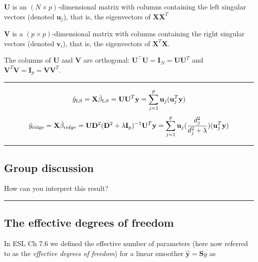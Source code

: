 \documentclass[
  letterpaper,
  DIV=11,
  numbers=noendperiod]{scrartcl}
\begin{document}
\(\mathbf{U}\) is an \((N \times p)\)-dimensional matrix with columns
containing the left singular vectors (denoted \(\mathbf{u}_j\)), that
is, the eigenvectors of \({\mathbf X}{\mathbf X}^T\)

\(\mathbf{V}\) is a \((p \times p)\)-dimensional matrix with columns
containing the right singular vectors (denoted \(\mathbf{v}_i\)), that
is, the eigenvectors of \({\mathbf X}^T{\mathbf X}\).

The columns of \(\mathbf{U}\) and \(\mathbf{V}\) are orthogonal:
\(\mathbf{U}^{\top} \mathbf{U} = \mathbf{I}_{N} = \mathbf{U}\mathbf{U}^T\)
and
\(\mathbf{V}^T \mathbf{V}= \mathbf{I}_{p} = \mathbf{V}\mathbf{V}^T\).

\begin{center}\rule{0.5\linewidth}{0.5pt}\end{center}

\[\hat{y}_{\text{LS}}={\mathbf X}\hat{\beta}_{\text LS}= {\mathbf U}{\mathbf U}^T {\mathbf y}=\sum_{j=1}^p {\mathbf u}_j ({\mathbf u}_j^T {\mathbf y})\]
\[\hat{y}_{\text{ridge}}={\mathbf X}\hat{\beta}_{\text ridge}=
{\mathbf U}{\mathbf D}^2({\mathbf D}^2+\lambda {\mathbf I}_p)^{-1}{\mathbf U}^T {\mathbf y}=
\sum_{j=1}^p {\mathbf u}_j (\frac{d_j^2}{d_j^2+\lambda})({\mathbf u}_j^T {\mathbf y})\]

\begin{center}\rule{0.5\linewidth}{0.5pt}\end{center}

\hypertarget{group-discussion-2}{%
\subsection{Group discussion}\label{group-discussion-2}}

How can you interpret this result?

\begin{center}\rule{0.5\linewidth}{0.5pt}\end{center}

\hypertarget{the-effective-degrees-of-freedom}{%
\subsection{The effective degrees of
freedom}\label{the-effective-degrees-of-freedom}}

In ESL Ch 7.6 we defined the effective number of parameters (here now
referred to as the \emph{effective degrees of freedom}) for a linear
smoother \(\hat{\mathbf y}={\mathbf Sy}\) as
\end{document}
